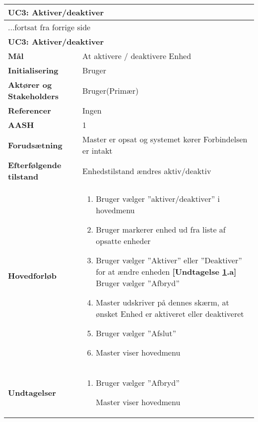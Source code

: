 \begin{center} \centering \label{UC3} 
	\begin{longtable}{|p{5cm}|p{9cm}|}  %
	\hline
		\multicolumn{2}{|l|}{\textbf{UC3: Aktiver/deaktiver}} \\\hline %
		\endfirsthead
		
		\multicolumn{2}{l}{...fortsat fra forrige side} \\ \hline %
		\multicolumn{2}{|l|}{\textbf{UC3: Aktiver/deaktiver}} \\\hline %
		\endhead	
		
		\textbf{Mål}								&At aktivere / deaktivere Enhed	\\\hline
		\textbf{Initialisering}					&Bruger				\\\hline
		\textbf{Aktører og Stakeholders}			&Bruger(Primær)		\\\hline
		\textbf{Referencer}						&Ingen				\\\hline
		\textbf{AASH}							&1					\\\hline
		\textbf{Forudsætning}					&Master er opsat og systemet kører \newline
												 Forbindelsen er intakt	\\\hline
		\textbf{Efterfølgende tilstand}			&Enhedstilstand ændres aktiv/deaktiv\\\hline
		\textbf{Hovedforløb}					
			&\begin{enumerate}
	
	
				\item Bruger vælger ''aktiver/deaktiver'' i hovedmenu
				
				\item Bruger markerer enhed ud fra liste af opsatte enheder
				
				\item \label{uc3aktiver} Bruger vælger ''Aktiver'' eller ''Deaktiver'' for at ændre enheden\newline
				\textbf{[Undtagelse \ref{uc3aktiver}.a]} Bruger vælger ''Afbryd''
				
				\item Master udskriver på dennes skærm, at ønsket Enhed er aktiveret eller deaktiveret		
			
				\item Bruger vælger ''Afslut''
				
				\item Master viser hovedmenu	
	
			\end{enumerate}\\\hline
			
		\textbf{Undtagelser}
			&\begin{enumerate}[label=\ref{uc3aktiver}.a]
				
				\item Bruger vælger ''Afbryd''
				
					\subitem Master viser hovedmenu
			\end{enumerate}\\\hline			
			
	\end{longtable}
\end{center}

